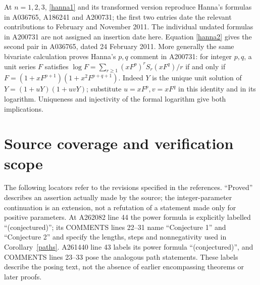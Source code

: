 \documentclass[11pt]{article}
\begin{document}
At $n=1,2,3$, \eqref{hanna1} and its transformed version reproduce
Hanna's formulas in A036765, A186241 and A200731; the first two
entries date the relevant contributions to February and November 2011.
The individual undated formulas in A200731 are not assigned an insertion
date here. Equation \eqref{hanna2} gives the second
pair in A036765, dated 24 February 2011.
More generally the same bivariate calculation proves Hanna's $p,q$
comment in A200731: for integer $p,q$, a unit series $F$ satisfies
$\log F=\sum_{r\geq1}(xF^p)^rS_r(xF^q)/r$ if and only if
$F=(1+xF^{p+1})(1+x^2F^{p+q+1})$.
Indeed $Y$ is the unique unit solution of
$Y=(1+uY)(1+uvY)$; substitute $u=xF^p,v=xF^q$ in this identity and
in its logarithm. Uniqueness and injectivity of the formal logarithm
give both implications.

\section{Source coverage and verification scope}
The following locators refer to the revisions specified in the references.
``Proved'' describes an assertion actually made by the source; the
integer-parameter continuation is an extension, not a refutation of a
statement made only for positive parameters.
At A262082 line 44 the power formula is explicitly labelled
``(conjectured)''; its COMMENTS lines 22--31 name ``Conjecture 1''
and ``Conjecture 2'' and specify the lengths, steps and nonnegativity
used in Corollary~\ref{paths}. A261440 line 43 labels its power formula
``(conjectured)'', and COMMENTS lines 23--33 pose the analogous path
statements. These labels describe the posing text, not the absence of
earlier encompassing theorems or later proofs.
\setlength{\LTpre}{3pt}
\end{document}
